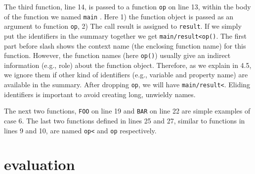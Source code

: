 \documentclass[10pt, preprint]{sigplanconf}
\begin{document}
{The third function, line 14, is passed to a function {\small\texttt{op}} on line 13, within the body of the function we named {\small\texttt{main}} . Here 1) the function object is passed as an argument to function {\small\texttt{op}}, 2) The call result is assigned to {\small\texttt{result}}. If we simply put the identifiers in the summary together we get {\small\texttt{main/result<op()}}. The first part before slash  shows the context name (the enclosing function name) for this function.  However, the function names (here {\small\texttt{op()}}) usually give an indirect information (e.g., role) about the function object. Therefore, as we explain in 4.5, we ignore them if other kind of identifiers (e.g., variable and property name) are available in the summary. After dropping {\small\texttt{op}}, we will have {\small\texttt{main/result<}}. Eliding identifiers is important to avoid creating long, unwieldy names.

The next two functions, {\small\texttt{FOO}} on line 19 and {\small\texttt{BAR}} on line 22 are simple examples of case 6.  The last two functions defined in lines 25 and 27, similar to functions in lines 9 and 10, are named {\small\texttt{op<}} and {\small\texttt{op}} respectively. 


\section{evaluation}

}
\end{document}
